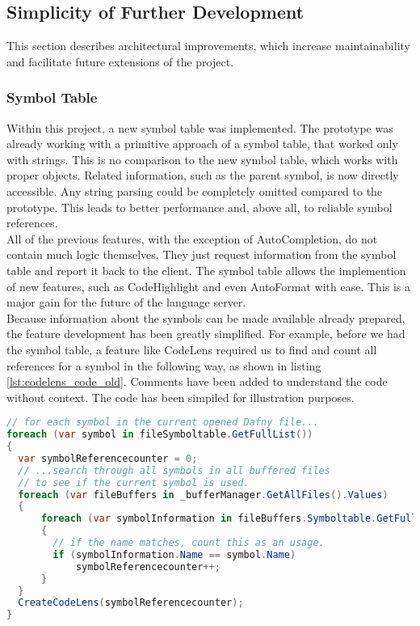 \subsection{Simplicity of Further Development}
This section describes architectural improvements,
which increase maintainability and facilitate future extensions of the project.

\subsubsection{Symbol Table}
Within this project, a new symbol table was implemented.
The prototype was already working with a primitive approach of a symbol table, that worked only with strings.
This is no comparison to the new symbol table, which works with proper objects.
Related information, such as the parent symbol, is now directly accessible.
Any string parsing could be completely omitted compared to the prototype.
This leads to better performance and, above all, to reliable symbol references.\\

All of the previous features, with the exception of AutoCompletion, do not contain much logic themselves.
They just request information from the symbol table and report it back to the client.
The symbol table allows the implemention of new features, such as CodeHighlight and even AutoFormat with ease.
This is a major gain for the future of the language server.\\


Because information about the symbols can be made available already prepared,
the feature development has been greatly simplified.
For example, before we had the symbol table,
a feature like CodeLens required us to find and count all references for a symbol in the following way,
as shown in listing \ref{lst:codelens_code_old}.
Comments have been added to understand the code without context. The code has been simpiled for illustration purposes.

\begin{lstlisting}[language=csharp, caption={Example for CodeLens in the Prototype}, captionpos=b, label={lst:codelens_code_old}]
// for each symbol in the current opened Dafny file...
foreach (var symbol in fileSymboltable.GetFullList())
{
  var symbolReferencecounter = 0;
  // ...search through all symbols in all buffered files
  // to see if the current symbol is used.
  foreach (var fileBuffers in _bufferManager.GetAllFiles().Values)
  {
      foreach (var symbolInformation in fileBuffers.Symboltable.GetFullList())
      {
        // if the name matches, count this as an usage.
        if (symbolInformation.Name == symbol.Name)
            symbolReferencecounter++;
      }
  }
  CreateCodeLens(symbolReferencecounter);
}
\end{lstlisting}

